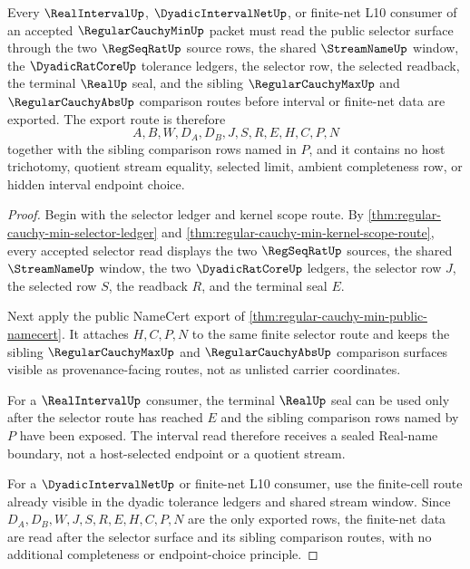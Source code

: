 \begin{theorem}
\label{thm:regular-cauchy-min-public-selector-export}
Every $\RealIntervalUp$, $\DyadicIntervalNetUp$, or finite-net L10 consumer of an accepted $\RegularCauchyMinUp$ packet must read the public selector surface through the two $\RegSeqRatUp$ source rows, the shared $\StreamNameUp$ window, the $\DyadicRatCoreUp$ tolerance ledgers, the selector row, the selected readback, the terminal $\RealUp$ seal, and the sibling $\RegularCauchyMaxUp$ and $\RegularCauchyAbsUp$ comparison routes before interval or finite-net data are exported. The export route is therefore
$$
A,B,W,D_A,D_B,J,S,R,E,H,C,P,N
$$
together with the sibling comparison rows named in $P$, and it contains no host trichotomy, quotient stream equality, selected limit, ambient completeness row, or hidden interval endpoint choice.
\end{theorem}
\begin{proof}
Begin with the selector ledger and kernel scope route. By \autoref{thm:regular-cauchy-min-selector-ledger} and \autoref{thm:regular-cauchy-min-kernel-scope-route}, every accepted selector read displays the two $\RegSeqRatUp$ sources, the shared $\StreamNameUp$ window, the two $\DyadicRatCoreUp$ ledgers, the selector row $J$, the selected row $S$, the readback $R$, and the terminal seal $E$.

Next apply the public NameCert export of \autoref{thm:regular-cauchy-min-public-namecert}. It attaches $H,C,P,N$ to the same finite selector route and keeps the sibling $\RegularCauchyMaxUp$ and $\RegularCauchyAbsUp$ comparison surfaces visible as provenance-facing routes, not as unlisted carrier coordinates.

For a $\RealIntervalUp$ consumer, the terminal $\RealUp$ seal can be used only after the selector route has reached $E$ and the sibling comparison rows named by $P$ have been exposed. The interval read therefore receives a sealed Real-name boundary, not a host-selected endpoint or a quotient stream.

For a $\DyadicIntervalNetUp$ or finite-net L10 consumer, use the finite-cell route already visible in the dyadic tolerance ledgers and shared stream window. Since $D_A,D_B,W,J,S,R,E,H,C,P,N$ are the only exported rows, the finite-net data are read after the selector surface and its sibling comparison routes, with no additional completeness or endpoint-choice principle.
\end{proof}

